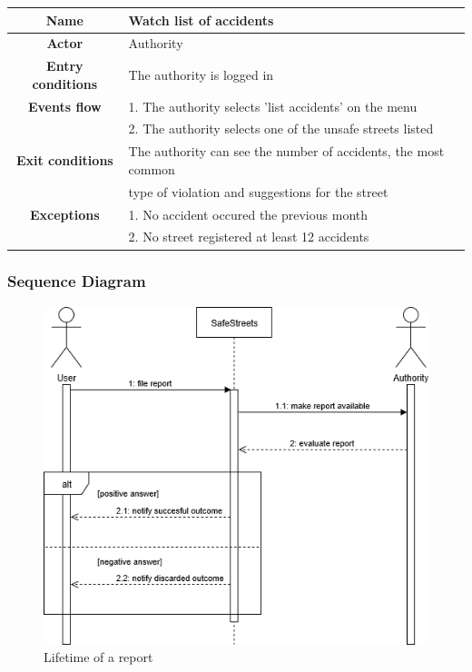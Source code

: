 \begin{flushleft}
\begin{tabular}{|c|l|}
\hline
    \textbf{Name} & Watch list of accidents\\ \hline
    \textbf{Actor} & Authority\\ \hline
    \textbf{Entry conditions} & The authority is logged in\\ \hline
    \textbf{Events flow} 
    & 1. The authority selects 'list accidents' on the menu\\
    & 2. The authority selects one of the unsafe streets listed\\ \hline
    \textbf{Exit conditions} 
    & The authority can see the number of accidents, the most common\\
    & type of violation and suggestions for the street\\ \hline
    \textbf{Exceptions} 
    & 1. No accident occured the previous month\\
    & 2. No street registered at least 12 accidents\\
\hline 
\end{tabular}
\end{flushleft}

\subsubsection{Sequence Diagram}
\begin{figure} [H]
    \includegraphics[scale=0.5]{Images/Diagrams/Sequence1.png}
    \caption{\label{fig:Sequence1}Lifetime of a report}
\end{figure}

